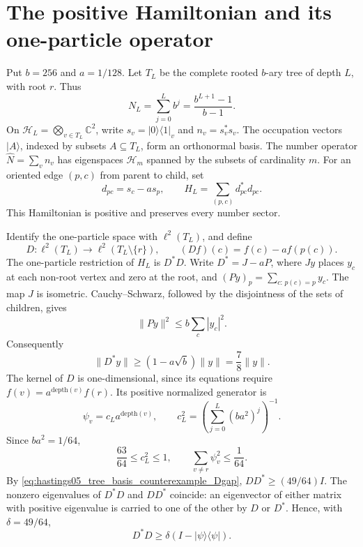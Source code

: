 \documentclass{article}
\providecommand{\C}{\mathbb C}
\providecommand{\cH}{\mathcal H}
\newcommand{\dep}{\mathrm{depth}}
\begin{document}
\section{The positive Hamiltonian and its one-particle operator}

Put $b=256$ and $a=1/128$. Let $T_L$ be the complete rooted $b$-ary tree
of depth $L$, with root $r$. Thus
\[
 N_L=\sum_{j=0}^Lb^j=\frac{b^{L+1}-1}{b-1}.
\]
On $\cH_L=\bigotimes_{v\in T_L}\C^2$, write
$s_v=|0\rangle\langle1|_v$ and $n_v=s_v^*s_v$.
The occupation vectors $|A\rangle$, indexed by subsets $A\subseteq T_L$,
form an orthonormal basis. The number operator
$\widehat N=\sum_v n_v$ has eigenspaces $\cH_m$ spanned by the subsets of
cardinality $m$.
For an oriented edge $(p,c)$ from parent to child, set
\begin{equation}
 d_{pc}=s_c-a s_p,\qquad
 H_L=\sum_{(p,c)}d_{pc}^*d_{pc}.
 \label{eq:hastings05_tree_basis_counterexample_H}
\end{equation}
This Hamiltonian is positive and preserves every number sector.

Identify the one-particle space with $\ell^2(T_L)$, and define
\[
 D:\ell^2(T_L)\longrightarrow\ell^2(T_L\setminus\{r\}),\qquad
 (Df)(c)=f(c)-a f(p(c)).
\]
The one-particle restriction of $H_L$ is $D^*D$.
Write $D^*=J-aP$, where $Jy$ places $y_c$ at each non-root vertex and zero
at the root, and $(Py)_p=\sum_{c:\,p(c)=p}y_c$.
The map $J$ is isometric. Cauchy--Schwarz, followed by the disjointness of
the sets of children, gives
\[
 \|Py\|^2\le b\sum_c|y_c|^2.
\]
Consequently
\begin{equation}
 \|D^*y\|\ge(1-a\sqrt b)\|y\|=\frac78\|y\|.
 \label{eq:hastings05_tree_basis_counterexample_Dgap}
\end{equation}
The kernel of $D$ is one-dimensional, since its equations require
$f(v)=a^{\dep(v)}f(r)$. Its positive normalized generator is
\[
 \psi_v=c_La^{\dep(v)},\qquad
 c_L^2=\left(\sum_{j=0}^L(ba^2)^j\right)^{-1}.
\]
Since $ba^2=1/64$,
\begin{equation}
 \frac{63}{64}\le c_L^2\le1,
 \qquad \sum_{v\ne r}\psi_v^2\le\frac1{64}.
 \label{eq:hastings05_tree_basis_counterexample_tail}
\end{equation}
By \eqref{eq:hastings05_tree_basis_counterexample_Dgap},
$DD^*\ge(49/64)I$. The nonzero eigenvalues of $D^*D$ and $DD^*$ coincide:
an eigenvector of either matrix with positive eigenvalue is carried to
one of the other by $D$ or $D^*$. Hence, with $\delta=49/64$,
\begin{equation}
 D^*D\ge\delta(I-|\psi\rangle\langle\psi|).
 \label{eq:hastings05_tree_basis_counterexample_oneparticle}
\end{equation}
\end{document}
